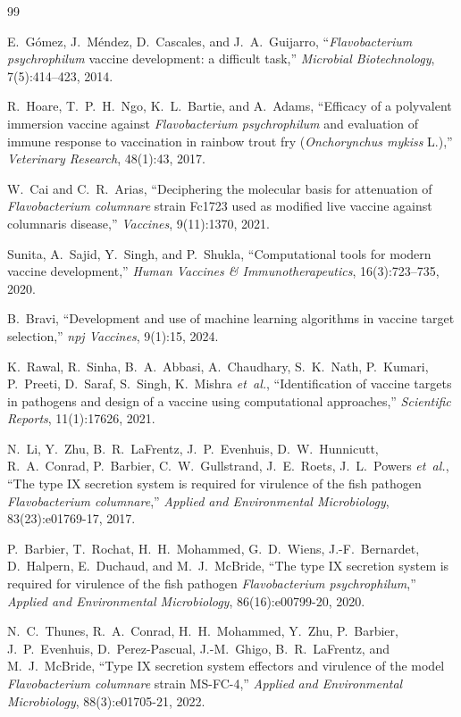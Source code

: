 \documentclass[pdflatex,sn-mathphys-num]{sn-jnl}
\begin{document}
\begin{thebibliography}{99}

E.~G{\'o}mez, J.~M{\'e}ndez, D.~Cascales, and J.~A.~Guijarro,
``\textit{Flavobacterium psychrophilum} vaccine development: a difficult task,''
\emph{Microbial Biotechnology}, 7(5):414--423, 2014.

R.~Hoare, T.~P.~H.~Ngo, K.~L.~Bartie, and A.~Adams,
``Efficacy of a polyvalent immersion vaccine against \textit{Flavobacterium psychrophilum} and evaluation of immune response to vaccination in rainbow trout fry (\textit{Onchorynchus mykiss} L.),''
\emph{Veterinary Research}, 48(1):43, 2017.

W.~Cai and C.~R.~Arias,
``Deciphering the molecular basis for attenuation of \textit{Flavobacterium columnare} strain Fc1723 used as modified live vaccine against columnaris disease,''
\emph{Vaccines}, 9(11):1370, 2021.

Sunita, A.~Sajid, Y.~Singh, and P.~Shukla,
``Computational tools for modern vaccine development,''
\emph{Human Vaccines \& Immunotherapeutics}, 16(3):723--735, 2020.

B.~Bravi,
``Development and use of machine learning algorithms in vaccine target selection,''
\emph{npj Vaccines}, 9(1):15, 2024.

K.~Rawal, R.~Sinha, B.~A.~Abbasi, A.~Chaudhary, S.~K.~Nath, P.~Kumari, P.~Preeti, D.~Saraf, S.~Singh, K.~Mishra \emph{et~al.},
``Identification of vaccine targets in pathogens and design of a vaccine using computational approaches,''
\emph{Scientific Reports}, 11(1):17626, 2021.

N.~Li, Y.~Zhu, B.~R.~LaFrentz, J.~P.~Evenhuis, D.~W.~Hunnicutt, R.~A.~Conrad, P.~Barbier, C.~W.~Gullstrand, J.~E.~Roets, J.~L.~Powers \emph{et~al.},
``The type IX secretion system is required for virulence of the fish pathogen \textit{Flavobacterium columnare},''
\emph{Applied and Environmental Microbiology}, 83(23):e01769-17, 2017.

P.~Barbier, T.~Rochat, H.~H.~Mohammed, G.~D.~Wiens, J.-F.~Bernardet, D.~Halpern, E.~Duchaud, and M.~J.~McBride,
``The type IX secretion system is required for virulence of the fish pathogen \textit{Flavobacterium psychrophilum},''
\emph{Applied and Environmental Microbiology}, 86(16):e00799-20, 2020.

N.~C.~Thunes, R.~A.~Conrad, H.~H.~Mohammed, Y.~Zhu, P.~Barbier, J.~P.~Evenhuis, D.~Perez-Pascual, J.-M.~Ghigo, B.~R.~LaFrentz, and M.~J.~McBride,
``Type IX secretion system effectors and virulence of the model \textit{Flavobacterium columnare} strain MS-FC-4,''
\emph{Applied and Environmental Microbiology}, 88(3):e01705-21, 2022.


\end{thebibliography}
\end{document}
